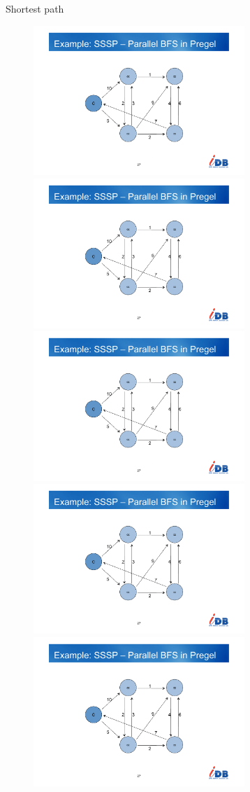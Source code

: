 \begin{frame}{Shortest path}
\begin{figure}
\begin{overprint}
\centering\includegraphics[width=8cm,page=5]{figs/12/shortest.pdf}
\centering\includegraphics[width=8cm,page=6]{figs/12/shortest.pdf}
\centering\includegraphics[width=8cm,page=7]{figs/12/shortest.pdf}
\centering\includegraphics[width=8cm,page=8]{figs/12/shortest.pdf}
\centering\includegraphics[width=8cm,page=9]{figs/12/shortest.pdf}

\end{overprint}
\end{figure}
\end{frame}
